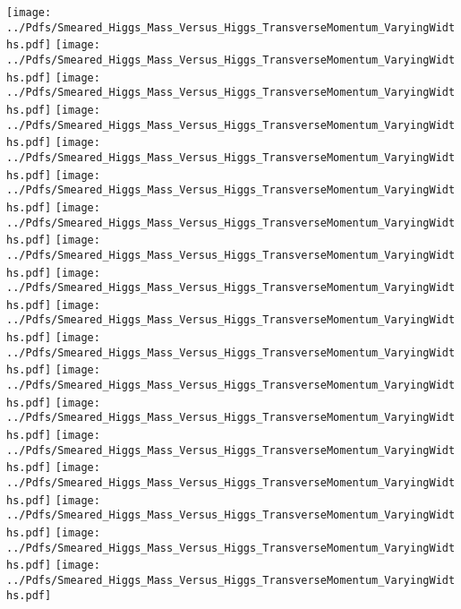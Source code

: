 \documentclass[a4wide,10pt]{article}
\begin{document}
\texttt{[image: ../Pdfs/Smeared\_Higgs\_Mass\_Versus\_Higgs\_TransverseMomentum\_VaryingWidths.pdf]}
\texttt{[image: ../Pdfs/Smeared\_Higgs\_Mass\_Versus\_Higgs\_TransverseMomentum\_VaryingWidths.pdf]}
\texttt{[image: ../Pdfs/Smeared\_Higgs\_Mass\_Versus\_Higgs\_TransverseMomentum\_VaryingWidths.pdf]}
\texttt{[image: ../Pdfs/Smeared\_Higgs\_Mass\_Versus\_Higgs\_TransverseMomentum\_VaryingWidths.pdf]}
\texttt{[image: ../Pdfs/Smeared\_Higgs\_Mass\_Versus\_Higgs\_TransverseMomentum\_VaryingWidths.pdf]}
\texttt{[image: ../Pdfs/Smeared\_Higgs\_Mass\_Versus\_Higgs\_TransverseMomentum\_VaryingWidths.pdf]}
\texttt{[image: ../Pdfs/Smeared\_Higgs\_Mass\_Versus\_Higgs\_TransverseMomentum\_VaryingWidths.pdf]}
\texttt{[image: ../Pdfs/Smeared\_Higgs\_Mass\_Versus\_Higgs\_TransverseMomentum\_VaryingWidths.pdf]}
\texttt{[image: ../Pdfs/Smeared\_Higgs\_Mass\_Versus\_Higgs\_TransverseMomentum\_VaryingWidths.pdf]}
\texttt{[image: ../Pdfs/Smeared\_Higgs\_Mass\_Versus\_Higgs\_TransverseMomentum\_VaryingWidths.pdf]}
\texttt{[image: ../Pdfs/Smeared\_Higgs\_Mass\_Versus\_Higgs\_TransverseMomentum\_VaryingWidths.pdf]}
\texttt{[image: ../Pdfs/Smeared\_Higgs\_Mass\_Versus\_Higgs\_TransverseMomentum\_VaryingWidths.pdf]}
\texttt{[image: ../Pdfs/Smeared\_Higgs\_Mass\_Versus\_Higgs\_TransverseMomentum\_VaryingWidths.pdf]}
\texttt{[image: ../Pdfs/Smeared\_Higgs\_Mass\_Versus\_Higgs\_TransverseMomentum\_VaryingWidths.pdf]}
\texttt{[image: ../Pdfs/Smeared\_Higgs\_Mass\_Versus\_Higgs\_TransverseMomentum\_VaryingWidths.pdf]}
\texttt{[image: ../Pdfs/Smeared\_Higgs\_Mass\_Versus\_Higgs\_TransverseMomentum\_VaryingWidths.pdf]}
\texttt{[image: ../Pdfs/Smeared\_Higgs\_Mass\_Versus\_Higgs\_TransverseMomentum\_VaryingWidths.pdf]}
\texttt{[image: ../Pdfs/Smeared\_Higgs\_Mass\_Versus\_Higgs\_TransverseMomentum\_VaryingWidths.pdf]}
\end{document}
